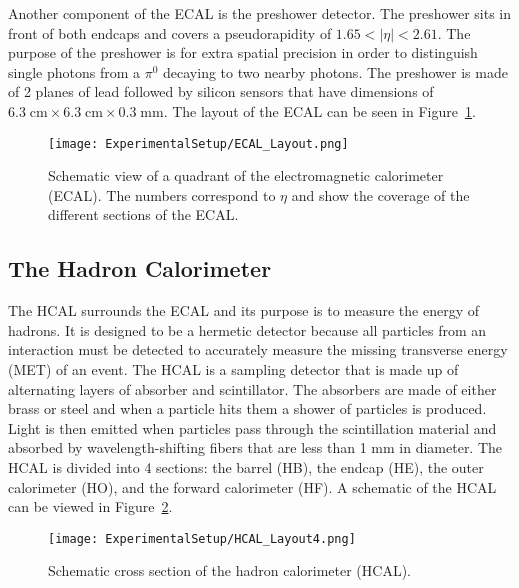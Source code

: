 Another component of the ECAL is the preshower detector. The preshower sits in front of both endcaps and covers a pseudorapidity of $1.65 < |\eta| < 2.61$. The purpose of the preshower is for extra spatial precision in order to distinguish single photons from a $\pi^{0}$ decaying to two nearby photons. The preshower is made of 2 planes of lead followed by silicon sensors that have dimensions of $6.3\;\mathrm{cm}\times6.3\;\mathrm{cm}\times0.3\;\mathrm{mm}$\cite{CMSExperiment}\cite{CMSECAL}. The layout of the ECAL can be seen in Figure~\ref{fig:ECALSchematic}.

\begin{figure}[h!]
\begin{center}
\texttt{[image: ExperimentalSetup/ECAL\_Layout.png]}
\end{center}
\caption{Schematic view of a quadrant of the electromagnetic calorimeter (ECAL). The numbers correspond to $\eta$ and show the coverage of the different sections of the ECAL.}
\label{fig:ECALSchematic}
\end{figure}

\subsection{The Hadron Calorimeter}

The HCAL surrounds the ECAL and its purpose is to measure the energy of hadrons. It is designed to be a hermetic detector because all particles from an interaction must be detected to accurately measure the missing transverse energy (MET) of an event. The HCAL is a sampling detector that is made up of alternating layers of absorber and scintillator. The absorbers are made of either brass or steel and when a particle hits them a shower of particles is produced. Light is then emitted when particles pass through the scintillation material and absorbed by wavelength-shifting fibers that are less than 1 mm in diameter. The HCAL is divided into 4 sections: the barrel (HB), the endcap (HE), the outer calorimeter (HO), and the forward calorimeter (HF). A schematic of the HCAL can be viewed in Figure~\ref{fig:HCALSchematic}\cite{CMSExperiment}.

\begin{figure}[h!]
\begin{center}
\texttt{[image: ExperimentalSetup/HCAL\_Layout4.png]}
\end{center}
\caption{Schematic cross section of the hadron calorimeter (HCAL).}
\label{fig:HCALSchematic}
\end{figure}

